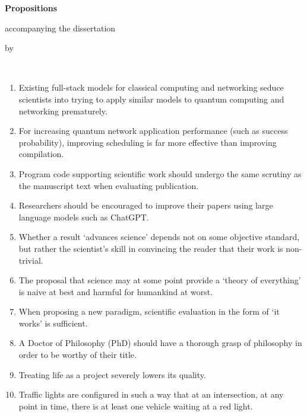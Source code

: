 \begin{center}

{\Large\titlefont\bfseries Propositions}

\medskip

accompanying the dissertation

\medskip

{\makeatletter
\titlestyle\bfseries\large\@title
\makeatother}

{\makeatletter
\ifx\@subtitle\undefined\else
\titlefont\titleshape\@subtitle
\fi
\makeatother}

\medskip

by

\medskip

\makeatletter
{\large\titlefont\bfseries\@firstname\ {\titleshape\@lastname}}
\makeatother

\end{center}

\bigskip

\begin{enumerate}[widest=10]
  \item Existing full-stack models for classical computing and networking seduce scientists into trying to apply similar models to quantum computing and networking prematurely.
  \item For increasing quantum network application performance (such as success probability), improving scheduling is far more effective than improving compilation.
  
  \item Program code supporting scientific work should undergo the same scrutiny as the manuscript text when evaluating publication.
  \item Researchers should be encouraged to improve their papers using large language models such as ChatGPT.
  \item Whether a result `advances science' depends not on some objective standard, but rather the scientist's skill in convincing the reader that their work is non-trivial.
  \item The proposal that science may at some point provide a `theory of everything' is naive at best and harmful for humankind at worst.
  \item When proposing a new paradigm, scientific evaluation in the form of `it works' is sufficient.
  \item A Doctor of Philosophy (PhD) should have a thorough grasp of philosophy in order to be worthy of their title.
  \item Treating life as a project severely lowers its quality.
  \item Traffic lights are configured in such a way that at an intersection, at any point in time, there is at least one vehicle waiting at a red light.

\end{enumerate}


